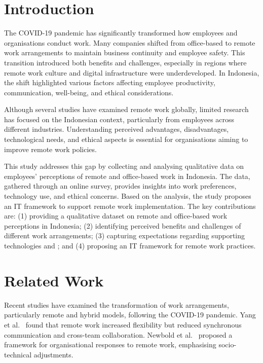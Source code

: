 \documentclass{infotel}
\begin{document}
\section{Introduction}

The COVID-19 pandemic has significantly transformed how employees and organisations conduct work. Many companies shifted from office-based to remote work arrangements to maintain business continuity and employee safety. This transition introduced both benefits and challenges, especially in regions where remote work culture and digital infrastructure were underdeveloped. In Indonesia, the shift highlighted various factors affecting employee productivity, communication, well-being, and ethical considerations.

Although several studies have examined remote work globally, limited research has focused on the Indonesian context, particularly from employees across different industries. Understanding perceived advantages, disadvantages, technological needs, and ethical aspects is essential for organisations aiming to improve remote work policies.

This study addresses this gap by collecting and analysing qualitative data on employees' perceptions of remote and office-based work in Indonesia. The data, gathered through an online survey, provides insights into work preferences, technology use, and ethical concerns. Based on the analysis, the study proposes an IT framework to support remote work implementation. The key contributions are: (1) providing a qualitative dataset on remote and office-based work perceptions in Indonesia; (2) identifying perceived benefits and challenges of different work arrangements; (3) capturing expectations regarding supporting technologies and ; and (4) proposing an IT framework for remote work practices.


\section{Related Work}

Recent studies have examined the transformation of work arrangements, particularly remote and hybrid models, following the COVID-19 pandemic. Yang et al.~\cite{yang2022effects} found that remote work increased flexibility but reduced synchronous communication and cross-team collaboration. Newbold et al.~\cite{Newbold2022NewNormals} proposed a framework for organisational responses to remote work, emphasising socio-technical adjustments.
\end{document}
